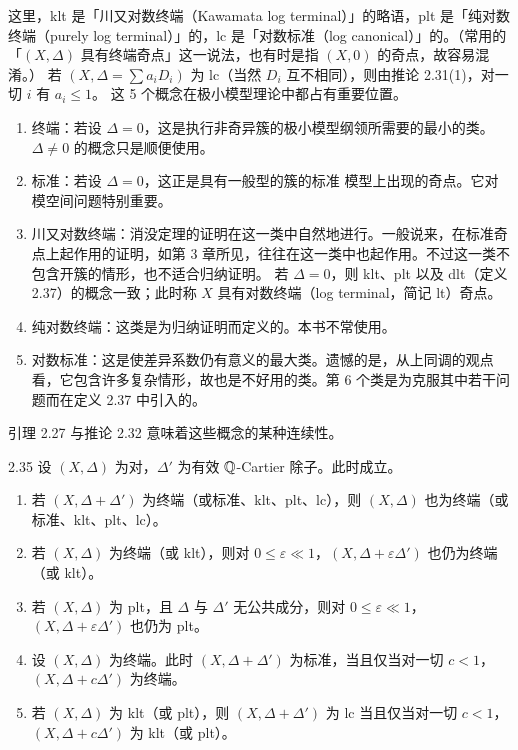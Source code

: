 
这里，klt 是「川又对数终端（Kawamata log terminal）」的略语，plt 是「纯对数终端（purely log terminal）」的，lc 是「对数标准（log canonical）」的。（常用的「$(X,\Delta)$ 具有终端奇点」这一说法，也有时是指 $(X,0)$ 的奇点，故容易混淆。）
若 $(X,\Delta=\sum a_iD_i)$ 为 lc（当然 $D_i$ 互不相同），则由推论 2.31(1)，对一切 $i$ 有 $a_i\le1$。
这 5 个概念在极小模型理论中都占有重要位置。
\begin{enumerate}[label=（\arabic*）,leftmargin=2.6em,itemsep=1pt]
\item 终端：若设 $\Delta=0$，这是执行非奇异簇的极小模型纲领所需要的最小的类。$\Delta\ne0$ 的概念只是顺便使用。
\item 标准：若设 $\Delta=0$，这正是具有一般型的簇的标准
模型上出现的奇点。它对模空间问题特别重要。
\item 川又对数终端：消没定理的证明在这一类中自然地进行。一般说来，在标准奇点上起作用的证明，如第 3 章所见，往往在这一类中也起作用。不过这一类不包含开簇的情形，也不适合归纳证明。
若 $\Delta=0$，则 klt、plt 以及 dlt（定义 2.37）的概念一致；此时称 $X$ 具有对数终端（log terminal，简记 lt）奇点。
\item 纯对数终端：这类是为归纳证明而定义的。本书不常使用。
\item 对数标准：这是使差异系数仍有意义的最大类。遗憾的是，从上同调的观点看，它包含许多复杂情形，故也是不好用的类。第 6 个类是为克服其中若干问题而在定义 2.37 中引入的。
\end{enumerate}
引理 2.27 与推论 2.32 意味着这些概念的某种连续性。

\begin{corollary}{2.35}
设 $(X,\Delta)$ 为对，$\Delta'$ 为有效 $\mathbb{Q}$-Cartier 除子。此时成立。
\begin{enumerate}[label=（\arabic*）,leftmargin=2.6em,itemsep=1pt]
\item 若 $(X,\Delta+\Delta')$ 为终端（或标准、klt、plt、lc），则 $(X,\Delta)$ 也为终端（或标准、klt、plt、lc）。
\item 若 $(X,\Delta)$ 为终端（或 klt），则对 $0\le\varepsilon\ll1$，$(X,\Delta+\varepsilon\Delta')$ 也仍为终端（或 klt）。
\item 若 $(X,\Delta)$ 为 plt，且 $\Delta$ 与 $\Delta'$ 无公共成分，则对 $0\le\varepsilon\ll1$，$(X,\Delta+\varepsilon\Delta')$ 也仍为 plt。
\item 设 $(X,\Delta)$ 为终端。此时 $(X,\Delta+\Delta')$ 为标准，当且仅当对一切 $c<1$，$(X,\Delta+c\Delta')$ 为终端。
\item 若 $(X,\Delta)$ 为 klt（或 plt），则 $(X,\Delta+\Delta')$ 为 lc 当且仅当对一切 $c<1$，$(X,\Delta+c\Delta')$ 为 klt（或 plt）。
\end{enumerate}
\end{corollary}

